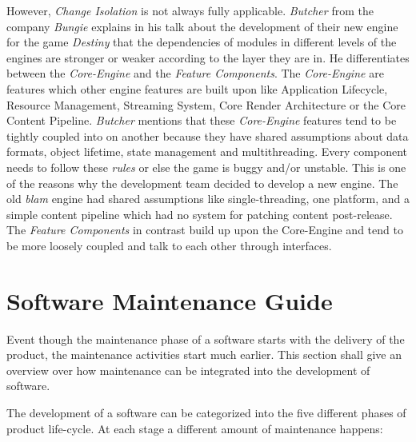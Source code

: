 However, \textit{Change Isolation} is not always fully applicable. \textit{Butcher} from the company \textit{Bungie} explains in his talk \citep{butcher_destiny_2015} about the development of their new engine for the game \textit{Destiny} that the dependencies of modules in different levels of the engines are stronger or weaker according to the layer they are in. He differentiates between the \textit{Core-Engine} and the \textit{Feature Components}. The \textit{Core-Engine} are features which other engine features are built upon like Application Lifecycle, Resource Management, Streaming System, Core Render Architecture or the Core Content Pipeline. \textit{Butcher} mentions that these \textit{Core-Engine} features tend to be tightly coupled into on another because they have shared assumptions about data formats, object lifetime, state management and multithreading. Every component needs to follow these \textit{rules} or else the game is buggy and/or unstable. This is one of the reasons why the development team decided to develop a new engine. The old \textit{blam} engine had shared assumptions like single-threading, one platform, and a simple content pipeline which had no system for patching content post-release. The \textit{Feature Components} in contrast build up upon the Core-Engine and tend to be more loosely coupled and talk to each other through interfaces.\citep{butcher_destiny_2015}

\section{Software Maintenance Guide}
\label{sec:softwareMaintenanceGuide}

Event though the maintenance phase of a software starts with the delivery of the product, the maintenance activities start much earlier.\citep{pigoski_software_2015} This section shall give an overview over how maintenance can be integrated into the development of software.

The development of a software can be categorized into the five different phases of product life-cycle. At each stage a different amount of maintenance happens:

